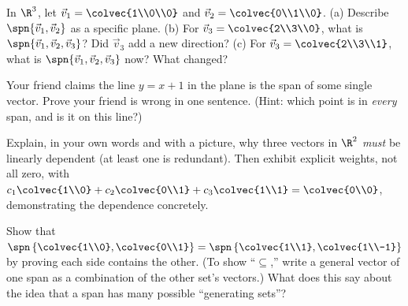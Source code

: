 \begin{exercise}\label{ch03:ex-third}
In $\R^3$, let $\vec{v}_1 = \colvec{1\\0\\0}$ and $\vec{v}_2 = \colvec{0\\1\\0}$.
(a) Describe $\spn\{\vec{v}_1,\vec{v}_2\}$ as a specific plane.
(b) For $\vec{v}_3 = \colvec{2\\3\\0}$, what is $\spn\{\vec{v}_1,\vec{v}_2,\vec{v}_3\}$? Did $\vec{v}_3$ add a new direction?
(c) For $\vec{v}_3 = \colvec{2\\3\\1}$, what is $\spn\{\vec{v}_1,\vec{v}_2,\vec{v}_3\}$ now? What changed?
\end{exercise}

\begin{exercise}\label{ch03:ex-affine}
Your friend claims the line $y = x + 1$ in the plane is the span of some single vector. Prove your friend is wrong in one sentence. (Hint: which point is in \emph{every} span, and is it on this line?)
\end{exercise}

\begin{exercise}\label{ch03:ex-counting}
Explain, in your own words and with a picture, why three vectors in $\R^2$ \emph{must} be linearly dependent (at least one is redundant). Then exhibit explicit weights, not all zero, with $c_1\colvec{1\\0} + c_2\colvec{0\\1} + c_3\colvec{1\\1} = \colvec{0\\0}$, demonstrating the dependence concretely.
\end{exercise}

\begin{exercise}\label{ch03:ex-same-span}
Show that $\spn\left\{\colvec{1\\0},\colvec{0\\1}\right\} = \spn\left\{\colvec{1\\1},\colvec{1\\-1}\right\}$ by proving each side contains the other. (To show ``$\subseteq$,'' write a general vector of one span as a combination of the other set's vectors.) What does this say about the idea that a span has many possible ``generating sets''?
\end{exercise}


